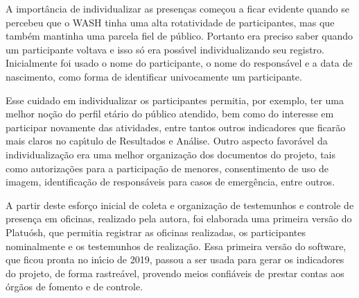 \documentclass[
12pt,		%
openright,	%
twoside,  %
a4paper,			%
chapter=TITLE,		%
english,			%
french,				%
spanish,			%
brazil				%
]{USPSC-classe/USPSC}
\begin{document}
A import\^ancia de individualizar as presen\c{c}as come\c{c}ou a ficar evidente quando se percebeu que o WASH tinha uma alta rotatividade de participantes, mas que tamb\'em mantinha uma parcela fiel de \textquotedbl p\'ublico\textquotedbl . Portanto era preciso saber quando um participante voltava e isso s\'o era poss\'{\i}vel individualizando seu registro. Inicialmente foi usado o nome do participante, o nome do respons\'avel e a data de nascimento, como forma de identificar univocamente um participante.

















Esse cuidado em individualizar os participantes permitia, por exemplo, ter uma melhor no\c{c}\~ao do perfil et\'ario do p\'ublico atendido, bem como do interesse em participar novamente das atividades, entre tantos outros indicadores que ficar\~ao mais claros no cap\'{\i}tulo de Resultados e An\'alise. Outro aspecto favor\'avel da individualiza\c{c}\~ao era uma melhor organiza\c{c}\~ao dos documentos do projeto, tais como autoriza\c{c}\~oes para a participa\c{c}\~ao de menores, consentimento de uso de imagem, identifica\c{c}\~ao de respons\'aveis para casos de emerg\^encia, entre outros.

















A partir deste esfor\c{c}o inicial de coleta e organiza\c{c}\~ao de testemunhos e controle de presen\c{c}a em oficinas, realizado pela autora, foi elaborada uma primeira vers\~ao do Platu\'osh, que permitia registrar as oficinas realizadas, os participantes nominalmente e os testemunhos de realiza\c{c}\~ao. Essa primeira vers\~ao do software, que ficou pronta no in\'{\i}cio de 2019, passou a ser usada para gerar os indicadores do projeto, de forma rastre\'avel, provendo meios confi\'aveis de prestar contas aos \'org\~aos de fomento e de controle.
\end{document}
